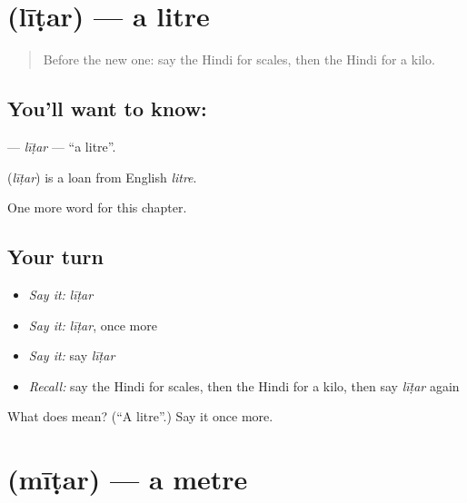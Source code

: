 \section[\texorpdfstring{\hi{लीटर} (līṭar)}{लीटर (līṭar)}]{ (līṭar) — a litre}

\label{lesson:HI-C251-litar}



\begin{quote}
Before the new one: say the Hindi for scales, then the Hindi for a kilo.
\end{quote}

\subsection*{You'll want to know: }
\textbf{} — \emph{līṭar} — \textquotedblleft{}a litre\textquotedblright{}.

\begin{cousinweb}
\textbf{} (\emph{līṭar}) is a loan from English \emph{litre}.
\end{cousinweb}

\begin{grammarlens}[title={What you've built}]
One more word for this chapter.
\end{grammarlens}

\subsection*{Your turn}
\begin{itemize}
\raggedright
  \item \emph{Say it:} \emph{līṭar}
  \item \emph{Say it:} \emph{līṭar}, once more
  \item \emph{Say it:} say \emph{līṭar}
  \item \emph{Recall:} say the Hindi for scales, then the Hindi for a kilo, then say \emph{līṭar} again
\end{itemize}

\begin{tcolorbox}[breakable,colback=teal!4,colframe=teal!35!black,title={Before you move on}]
What does  mean? (\textquotedblleft{}A litre\textquotedblright{}.) Say it once more.
\end{tcolorbox}
\section[\texorpdfstring{\hi{मीटर} (mīṭar)}{मीटर (mīṭar)}]{ (mīṭar) — a metre}

